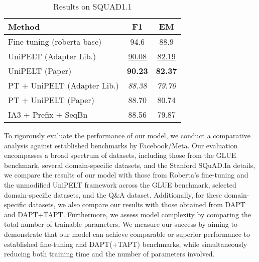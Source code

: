 \documentclass[10pt,twocolumn,letterpaper]{article}
\begin{document}
\begin{table}[!htbp]
\small %
\centering

\small %
\setlength{\tabcolsep}{9pt} %
\begin{tabular}{lcc}
\hline
\textbf{Method} & \textbf{F1} & \textbf{EM} \\ %
\hline\hline
Fine-tuning (roberta-base) & 94.6 & 88.9 \\
UniPELT (Adapter Lib.) & \underline{90.08} & \underline{82.19} \\ %
UniPELT (Paper) &  \textbf{90.23} & \textbf{82.37} \\
PT + UniPELT (Adapter Lib.) & \textit{88.38} & \textit{79.70} \\ %
PT + UniPELT (Paper) & 88.70 & 80.74 \\
IA3 + Prefix + SeqBn & 88.56 & 79.87 \\
\hline
\end{tabular}
\caption{Results on SQUAD1.1}
  \label{tab:table5}
\end{table}









To rigorously evaluate the performance of our model, we conduct a comparative analysis against established benchmarks by Facebook/Meta. Our evaluation encompasses a broad spectrum of datasets, including those from the GLUE benchmark, several domain-specific datasets, and the Stanford SQuAD.In details, we compare the results of our model with those from Roberta's fine-tuning and the unmodified UniPELT framework across the GLUE benchmark, selected domain-specific datasets, and the Q\&A dataset. Additionally, for these domain-specific datasets, we also compare our results with those obtained from DAPT and DAPT+TAPT. Furthermore, we assess model complexity by comparing the total number of trainable parameters. We measure our success by aiming to demonstrate that our model can achieve comparable or superior performance to established fine-tuning and DAPT(+TAPT) benchmarks, while simultaneously reducing both training time and the number of parameters involved.
\end{document}
